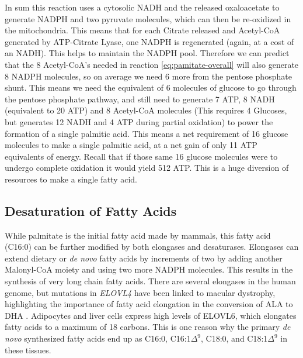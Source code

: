 \documentclass{tufte-handout}
\begin{document}
In sum this reaction uses a cytosolic NADH and the released oxaloacetate to generate NADPH and two pyruvate molecules, which can then be re-oxidized in the mitochondria.  This means that for each Citrate released and Acetyl-CoA generated by ATP-Citrate Lyase, one NADPH is regenerated (again, at a cost of an NADH).  This helps to maintain the NADPH pool.  Therefore we can predict that the 8 Acetyl-CoA's needed in reaction \ref{eq:pamitate-overall} will also generate 8 NADPH molecules, so on average we need 6 more from the pentose phosphate shunt.  This means we need the equivalent of 6 molecules of glucose to go through the pentose phosphate pathway, and still need to generate 7 ATP, 8 NADH (equivalent to 20 ATP) and 8 Acetyl-CoA molecules (This requires  4 Glucoses, but generates 12 NADH and 4 ATP during partial oxidation) to power the formation of a single palmitic acid.  This means a net requirement of 16 glucose molecules to make a single palmitic acid, at a net gain of only 11 ATP equivalents of energy.  Recall that if those same 16 glucose molecules were to undergo complete oxidation it would yield 512 ATP.  This is a huge diversion of resources to make a single fatty acid.

\subsection{Desaturation of Fatty Acids}

While palmitate is the initial fatty acid made by mammals, this fatty acid (C16:0) can be further modified by both elongases and desaturases.  Elongases can extend dietary or \textit{de novo} fatty acids by increments of two by adding another Malonyl-CoA moiety and using two more NADPH molecules.  This results in the synthesis of very long chain fatty acids.  There are several elongases in the human genome, but mutations in \textit{ELOVL4} have been linked to macular dystrophy, highlighting the importance of fatty acid elongation in the conversion of ALA to DHA \citep{Zhang2001}.  Adipocytes and liver cells express high levels of ELOVL6, which elongates fatty acids to a maximum of 18 carbons.  This is one reason why the primary \textit{de novo} synthesized fatty acids end up as C16:0, C16:1$\Delta^9$, C18:0, and C18:1$\Delta^9$ in these tissues.
\end{document}
